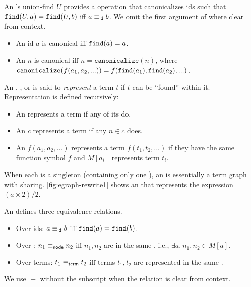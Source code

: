 \begin{definition}[Canonicalization]
    An \egraph's union-find $U$ provides a \find operation that canonicalizes \eclass ids
      such that ${\texttt{find}(U, a) = \texttt{find}(U, b)}$ iff ${a \equiv_{\sf id} b}$.
    We omit the first argument of \find where clear from context.
    \begin{itemize}
      \item An \eclass id $a$ is canonical iff $\texttt{find}(a) = a$.
      \item \raggedright
            An \enode $n$ is canonical iff $n = \texttt{canonicalize}(n)$,
            where ${\texttt{canonicalize}(f(a_{1}, a_{2}, ...)) = f(\texttt{find}(a_{1}), \texttt{find}(a_{2}), ...)}$.
    \end{itemize}
\end{definition}

\begin{definition}
  An \egraph, \eclass, or \enode is said to \textit{represent} a term $t$ if $t$ can be
    ``found'' within it. Representation is defined recursively:
  \begin{itemize}
    \item An \egraph represents a term if any of its \eclasses do.
    \item An \eclass $c$ represents a term if any \enode $n \in c$ does.
    \item An \enode $f(a_{1}, a_{2}, ...)$ represents a term $f(t_{1}, t_{2}, ...)$
          if they have the same function symbol $f$
          and \eclass $M[a_{i}]$ represents term $t_{i}$.
  \end{itemize}

  When each \eclass is a singleton (containing only one \enode),
    an \egraph is essentially a term graph with sharing.
  \autoref{fig:egraph-rewrite1} shows an \egraph that represents the
    expression $(a \times 2) / 2$.
\end{definition}

\begin{definition}[Equivalence]
  An \egraph defines three equivalence relations.
  \begin{itemize}
    \item Over \eclass ids: $a \equiv_{\sf id} b$ iff $\texttt{find}(a) = \texttt{find}(b)$.
    \item Over \enodes: $n_{1} \equiv_{\sf node} n_{2}$ iff \enodes $n_{1}, n_{2}$ are in the same \eclass,
          i.e., $\exists a.\ n_{1}, n_{2} \in M[a]$.
    \item Over terms: $t_{1} \equiv_{\sf term} t_{2}$ iff terms $t_{1}, t_{2}$ are represented in the same \eclass.
  \end{itemize}

  We use $\equiv$ without the subscript when the relation is clear from context.
\end{definition}

